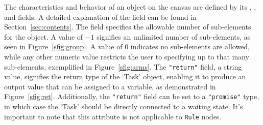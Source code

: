 \begin{figure}[!ht]
\end{figure}

The characteristics and behavior of an object on the canvas are defined by its , , and  fields. A detailed explanation of the  field can be found in Section~\ref{sec:contents}. The  field specifies the allowable number of sub-elements for the object. A value of $-1$ signifies an unlimited number of sub-elements, as seen in Figure~\ref{sfig:group}. A value of $0$ indicates no sub-elements are allowed, while any other numeric value restricts the user to specifying up to that many sub-elements, exemplified in Figure~\ref{sfig:arms}. The \texttt{"return"} field, a string value, signifies the return type of the `Task' object, enabling it to produce an output value that can be assigned to a variable, as demonstrated in Figure~\ref{sfig:ret}. Additionally, the \texttt{"return"} field can be set to a \texttt{"promise"} type, in which case the `Task' should be directly connected to a waiting state. It's important to note that this attribute is not applicable to \texttt{Rule} nodes.


